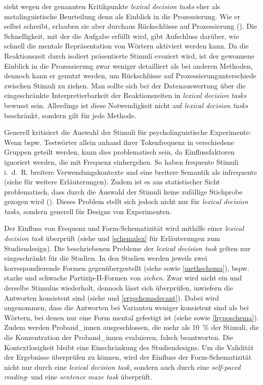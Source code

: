  \textcite[117]{Baayen.2014} sieht wegen der genannten Kritikpunkte \textit{lexical decision tasks} eher als metalinguistische Beurteilung denn als Einblick in die Prozessierung. Wie er selbst schreibt, erlauben sie aber durchaus Rückschlüsse auf Prozessierung (\cite[96]{Baayen.2014}). Die Schnelligkeit, mit  der die Aufgabe erfüllt wird, gibt Aufschluss darüber, wie schnell die mentale Repräsentation von Wörtern aktiviert werden kann. Da die Reaktionszeit durch isoliert präsentierte Stimuli evoziert wird, ist der gewonnene Einblick in die Prozessierung zwar weniger detailliert als bei anderen Methoden, dennoch kann er genutzt werden, um Rückschlüsse auf Prozessierungunterschiede zwischen Stimuli zu ziehen. Man sollte sich bei der Datenauswertung über die eingeschränkte Interpretierbarkeit der Reaktionszeiten in \textit{lexical decision tasks} bewusst sein. Allerdings ist diese Notwendigkeit nicht auf \textit{lexical decision tasks} beschränkt, sondern gilt für jede Methode. 



Generell kritisiert \textcite[99]{Baayen.2014} die Auswahl der Stimuli für psycholinguistische Experimente: Wenn bspw. Testwörter allein anhand ihrer Tokenfrequenz in verschiedene Gruppen geteilt werden, kann dies problematisch sein, da Einflussfaktoren ignoriert werden, die mit Frequenz einhergehen. So haben frequente Stimuli i.~d.~R. breitere Verwendungskontexte und eine breitere Semantik als infrequente (siehe  für weitere Erläuterungen). Zudem ist es aus statistischer Sicht problematisch, dass durch die Auswahl der Stimuli keine zufällige Stichprobe gezogen wird (\cite[99]{Baayen.2014}). Dieses Problem stellt sich jedoch nicht nur für \textit{lexical decision tasks}, sondern generell für Designs von Experimenten. 


Der Einfluss von Frequenz und Form-Schematizität wird mithilfe einer \textit{lexical decision task} überprüft (siehe  und \ref{schemalex} für Erläuterungen zum Studiendesign). Die beschriebenen Probleme der \textit{lexical decision task} gelten nur eingeschränkt für die Studien. In den Studien werden jeweils zwei korrespondierende Formen gegenübergestellt (siehe  sowie \ref{methschema}), bspw. starke und schwache Partizip-II-Formen von \textit{ziehen}. Zwar wird nicht ein und derselbe Stimulus wiederholt, dennoch lässt sich überprüfen, inwiefern die Antworten konsistent sind (siehe  und \ref{ergschemadecant}). Dabei wird angenommen, dass die Antworten bei Varianten weniger konsistent sind als bei Wörtern, bei denen nur eine Form mental gefestigt ist (siehe  sowie \ref{hyposchema}). Zudem werden Proband\_innen ausgeschlossen, die mehr als 10~\% der Stimuli, die die Konzentration der Proband\_innen evaluieren, falsch beantworten. Die Kontextlosigkeit bleibt eine Einschränkung des Studiendesigns. Um die Validität der Ergebnisse überprüfen zu können, wird der Einfluss der Form-Schematizität nicht nur durch eine \textit{lexical decision task}, sondern auch durch eine \textit{self-paced reading}- und eine \textit{sentence maze task} überprüft.

